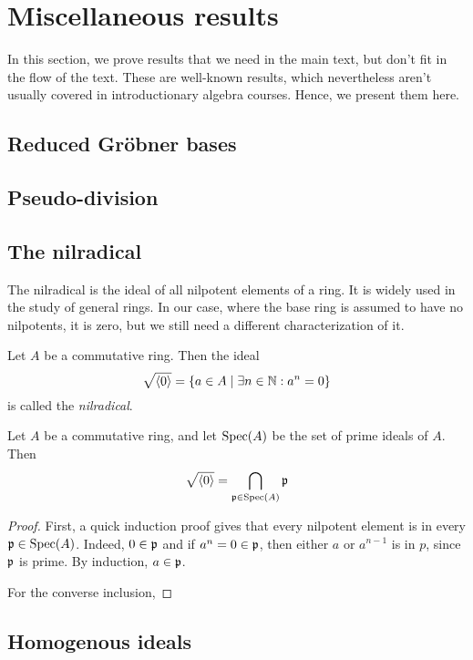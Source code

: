 \section{Miscellaneous results}
In this section, we prove results that we need in the main text, but don't fit in the flow of the text. These are well-known results, which nevertheless aren't usually covered in introductionary algebra courses. Hence, we present them here.

\subsection{Reduced Gröbner bases}

\subsection{Pseudo-division}\label{app:pseudo}


\subsection{The nilradical}
The nilradical is the ideal of all nilpotent elements of a ring. It is widely used in the study of general rings. In our case, where the base ring is assumed to have no nilpotents, it is zero, but we still need a different characterization of it.

\begin{definition}[Nilradical]
  Let $A$ be a commutative ring. Then the ideal \[\sqrt{\langle 0 \rangle} = \{a \in A \mid \exists n \in \mathbb{N} : a^{n} = 0\}\] is called the \textit{nilradical}.
\end{definition}

\begin{theorem}\label{thm:nil_rad_is_cap_primes}
  Let $A$ be a commutative ring, and let $\operatorname{Spec}(A)$ be the set of prime ideals of $A$. Then
  \[\sqrt{\langle 0 \rangle} = \bigcap_{\mathfrak p \in \operatorname{Spec}(A)} \mathfrak p\]
\end{theorem}
\begin{proof}
  First, a quick induction proof gives that every nilpotent element is in every $\mathfrak p \in \operatorname{Spec}(A)$. Indeed, $0 \in \mathfrak p$ and if $a^{n} = 0 \in \mathfrak p$, then either $a$ or $a^{n-1}$ is in $p$, since $\mathfrak p$ is prime. By induction, $a \in \mathfrak p$.

  For the converse inclusion,
\end{proof}




\subsection{Homogenous ideals}

